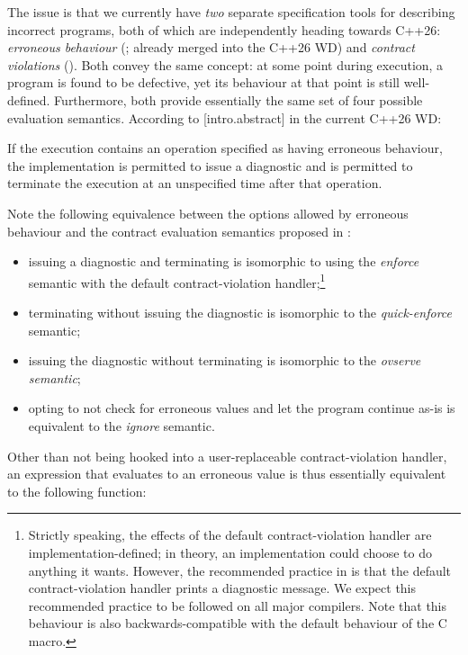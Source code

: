 The issue is that we currently have \emph{two} separate specification tools for describing incorrect programs, both of which are independently heading towards C++26: \emph{erroneous behaviour} (\cite{P2795R5}; already merged into the C++26 WD) and \emph{contract violations} (\cite{P2900R13}). Both convey the same concept: at some point during execution, a program is found to be defective, yet its behaviour at that point is still well-defined. Furthermore, both provide essentially the same set of four possible evaluation semantics. According to [intro.abstract] in the current C++26 WD:
\begin{adjustwidth}{0.5cm}{0.5cm}
If the execution contains an operation specified as having erroneous behaviour, the implementation is permitted to issue a diagnostic and is permitted to terminate the execution at an unspecified time after that operation.
\end{adjustwidth}
Note the following equivalence between the options allowed by erroneous behaviour and the contract evaluation semantics proposed in \cite{P2900R13}:
\begin{itemize}
  \item issuing a diagnostic and terminating is isomorphic to using the \emph{enforce} semantic with the default contract-violation handler;\footnote{Strictly speaking, the effects of the default contract-violation handler are implementation-defined; in theory, an implementation could choose to do anything it wants. However, the recommended practice in \cite{P2900R13} is that the default contract-violation handler prints a diagnostic message. We expect this recommended practice to be followed on all major compilers. Note that this behaviour is also backwards-compatible with the default behaviour of the C  macro.}
  \item  terminating without issuing the diagnostic is isomorphic to the \emph{quick-enforce} semantic;
  \item issuing the diagnostic without terminating is isomorphic to the \emph{ovserve semantic};
  \item opting to not check for erroneous values and let the program continue as-is is equivalent to the \emph{ignore} semantic.
  \end{itemize}

Other than not being hooked into a user-replaceable contract-violation handler, an expression  that evaluates to an erroneous value is thus essentially equivalent to the following function:

